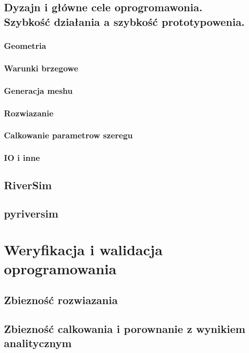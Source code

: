 \documentclass[]{pracamgr}
\begin{document}
    \cite{szewczuk1996triangle}
    \cite{dealII94}
    \cite{tethex}
    \cite{boost}
    \cite{riversim}
    \cite{riversimpy}

    \section{Dyzajn i główne cele oprogromawonia. Szybkość działania a szybkość prototypowenia.}
      \subsection{Geometria}
      \subsection{Warunki brzegowe}
      \subsection{Generacja meshu}
      \subsection{Rozwiazanie}
      \subsection{Calkowanie parametrow szeregu}
      \subsection{IO i inne}
    \section{RiverSim}
    \section{pyriversim}

  \chapter{Weryfikacja i walidacja oprogramowania}
    \section{Zbiezność rozwiazania}
    \section{Zbiezność calkowania i porownanie z wynikiem analitycznym}
\end{document}
